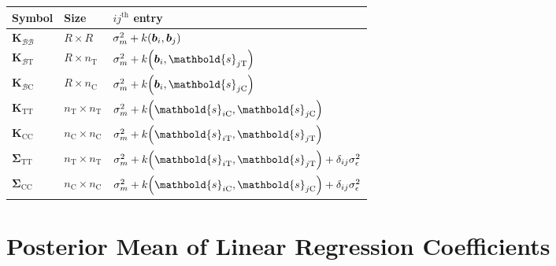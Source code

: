 \documentclass[letter,12pt]{article}
\DeclarePairedDelimiter{\parenthesis}{\lparen}{\rparen}
\newcommand{\del}[1]{\parenthesis*{#1}}
\newcommand{\treat}{\mathrm{T}}
\newcommand{\ctrol}{\mathrm{C}}
\newcommand{\sigman}{\sigma_{\epsilon}}
\newcommand{\svec}{\mathbold{s}}
\newcommand{\border}{\mathcal{B}}
\newcommand{\sentinel}{\bm{b}}
\newcommand{\numsent}{R}
\newcommand{\Kmat}{\mathbold{K}}
\newcommand{\SigmaMat}{\mathbold{\Sigma}}
\newcommand{\KBB}{\Kmat_{\border \border}}
\newcommand{\KBT}{\Kmat_{\border \treat}}
\newcommand{\KBC}{\Kmat_{\border \ctrol}}
\newcommand{\STT}{\SigmaMat_{\treat \treat}}
\newcommand{\SCC}{\SigmaMat_{\ctrol \ctrol}}
\newcommand{\KTT}{\Kmat_{\treat \treat}}
\newcommand{\KCC}{\Kmat_{\ctrol \ctrol}}
\begin{document}
\begin{center}
    \begin{tabular}{lll}
        \hline
        Symbol & Size                       & $ij^{\mathrm{th}}$ entry                                                      \\ \hline
        $\KBB$ & $\numsent \times \numsent$ & $\sigma_m^2 + k\del{\sentinel_i,\sentinel_j}$                                 \\ 
        $\KBT$ & $\numsent \times n_\treat$ & $\sigma_m^2 + k\del{\sentinel_i,\svec_{j\treat}}$                             \\ 
        $\KBC$ & $\numsent \times n_\ctrol$ & $\sigma_m^2 + k\del{\sentinel_i,\svec_{j\ctrol}}$                             \\
        $\KTT$ & $n_\treat \times n_\treat$ & $\sigma_m^2 + k\del{\svec_{i\ctrol},\svec_{j\ctrol}}$                         \\
        $\KCC$ & $n_\ctrol \times n_\ctrol$ & $\sigma_m^2 + k\del{\svec_{i\treat},\svec_{j\treat}}$                         \\ 
        $\STT$ & $n_\treat \times n_\treat$ & $\sigma_m^2 + k\del{\svec_{i\treat},\svec_{j\treat}} + \delta_{ij} \sigman^2$ \\ 
        $\SCC$ & $n_\ctrol \times n_\ctrol$ & $\sigma_m^2 + k\del{\svec_{i\ctrol},\svec_{j\ctrol}} + \delta_{ij} \sigman^2$ \\
        \hline
    \end{tabular}
\end{center}

\hypertarget{posterior-mean-of-betavec}{%
\section{Posterior Mean of Linear Regression Coefficients}
\label{sec:betahat}
}
\end{document}

